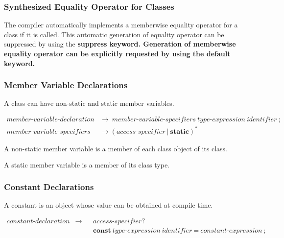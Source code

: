 \documentclass[a4paper,oneside,11pt]{article}
\begin{document}
\subsubsection{Synthesized Equality Operator for Classes}\label{sec:synthesizedeq}

The compiler automatically implements a memberwise equality operator for a class if it is called.
This automatic generation of equality operator can be suppressed by using the \bf{suppress} keyword.
Generation of memberwise equality operator can be explicitly requested by using the \bf{default} keyword.

\subsubsection{Member Variable Declarations}\label{membervariabledeclaration}

A class can have non-static and static member variables.

\begin{align*}
member\textrm{-}variable\textrm{-}declaration &\rightarrow \> member\textrm{-}variable\textrm{-}specifiers \> \hyperref[typeexpr]{type\textrm{-}expression} \>
\hyperref[identifier]{identifier} \> \texttt{;}\\
member\textrm{-}variable\textrm{-}specifiers &\rightarrow (\hyperref[accessspecifier]{access\textrm{-}specifier} \> | \> \textbf{static})^*
\end{align*}

A non-static member variable is a member of each class object of its class.

A static member variable is a member of its class type.

\subsubsection{Constant Declarations}\label{constantdeclaration}

A constant is an object whose value can be obtained at compile time.

\begin{align*}
constant\textrm{-}declaration &\rightarrow  & &\hyperref[accessspecifier]{access\textrm{-}specifier}?\\
& & &\textbf{const} \> \hyperref[typeexpr]{type\textrm{-}expression} \> \hyperref[identifier]{identifier} \> \texttt{=} \>
\hyperref[constantexpr]{constant\textrm{-}expression} \> \texttt{;}
\end{align*}
\end{document}
